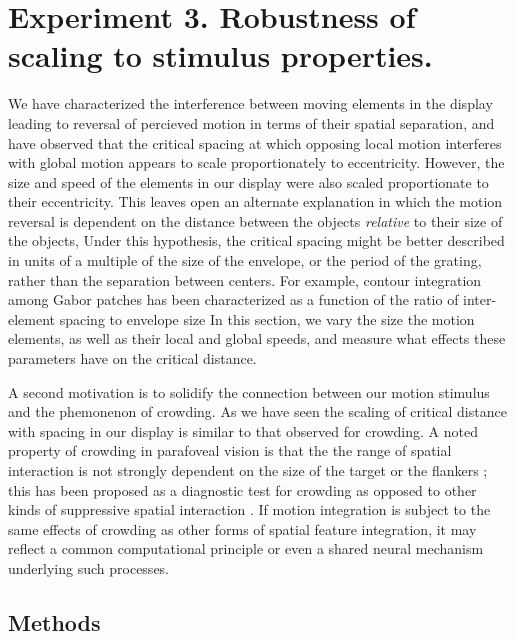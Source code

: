 \documentclass[../manuscript]{subfiles}
\begin{document}
\section[Experiment 3]{Experiment 3. Robustness of scaling to stimulus properties.}
\label{sec:grid}

We have characterized the interference between moving elements in the
display leading to reversal of percieved motion in terms of their
spatial separation, and have observed that the critical spacing at
which opposing local motion interferes with global motion appears to
scale proportionately to eccentricity. However, the size and
speed of the elements in our display were also scaled proportionate to their
eccentricity. This leaves open an alternate explanation in which the
motion reversal is dependent on the distance between the objects
\emph{relative} to their size of the objects, Under this hypothesis,
the critical spacing might be better described in units of a multiple
of the size of the envelope, or the period of the grating, rather than
the separation between centers. For example, contour integration among Gabor patches has been characterized as a function of the ratio of inter-element spacing to envelope size \citep{Beaudot:2003dz} In this section, we vary the size the motion
elements, as well as their local and global speeds, and measure what effects these
parameters have on the critical distance.

A second motivation is to solidify the connection between our motion
stimulus and the phemonenon of crowding. As we have seen the
scaling of critical distance with spacing in our display is similar to
that observed for crowding. A noted property of crowding in parafoveal vision is that the the range of
spatial interaction is not strongly dependent on the size of the
target or the flankers \citep{Levi:2002cs,Tripathy:2002kx}; this has
been proposed as a diagnostic test for crowding as opposed to other
kinds of suppressive spatial interaction \citep{Pelli:2004km}. If motion 
integration is subject to the same effects of crowding as other forms of spatial
feature integration, it may reflect a common computational principle
or even a shared neural mechanism underlying such processes. 

\subsection{Methods}
\label{sec:grid_methods}
\end{document}
